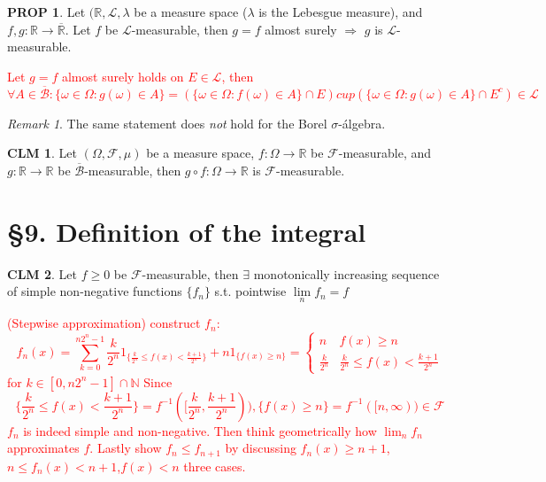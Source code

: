 \documentclass[hidelinks]{article}
\theoremstyle{definition}
\theoremstyle{dotless}
\newtheorem{proposition}{PROP}[section]
\newtheorem{claim}{CLM}[section]
\theoremstyle{remark}
\newtheorem*{remark}{Remark}
\begin{document}
\begin{proposition}
Let $(\mathbb{R},\mathscr{L},\lambda$ be a measure space ($\lambda$ is the Lebesgue measure), and $f,g:\mathbb{R}\to\overline{\mathbb{R}}$. Let $f$ be $\mathscr{L}$-measurable, then $g=f$ almost surely $\Rightarrow$ $g$ is $\mathscr{L}$-measurable.
\end{proposition}
\textcolor{red}{Let $g=f$ almost surely holds on $E\in\mathscr{L}$, then
\[\forall A\in\overline{\mathscr{B}}:\{\omega\in\Omega:g(\omega)\in A\}=(\{\omega\in\Omega:f(\omega)\in A\}\cap E)cup(\{\omega\in\Omega:g(\omega)\in A\}\cap E^c)\in\mathscr{L}\]}

\begin{remark}
The same statement does \emph{not} hold for the Borel $\sigma$-álgebra.
\end{remark}

\begin{claim}
Let $(\Omega,\mathscr{F},\mu)$ be a measure space, $f:\Omega\to\mathbb{R}$ be $\mathscr{F}$-measurable, and $g:\mathbb{R}\to\mathbb{R}$ be $\overline{\mathscr{B}}$-measurable, then $g\circ f:\Omega\to\mathbb{R}$ is $\mathscr{F}$-measurable.
\end{claim}

\bigbreak

\section*{\S9. Definition of the integral}
\setcounter{section}{9}

\begin{claim}
Let $f\geq0$ be $\mathscr{F}$-measurable, then $\exists$ monotonically increasing sequence of simple non-negative functions $\{f_n\}$ s.t. pointwise $\lim\limits_nf_n=f$
\end{claim}
\textcolor{red}{(Stepwise approximation) construct $f_n$:
\[f_n(x)=\sum_{k=0}^{n2^n-1}\frac{k}{2^n}1_{\{\frac{k}{2^n}\leq f(x)<\frac{k+1}{2^n}\}}+n1_{\{f(x)\geq n\}}=\begin{cases}
n & f(x)\geq n\\
\frac{k}{2^n} & \frac{k}{2^n}\leq f(x)<\frac{k+1}{2^n}
\end{cases}\]
for $k\in[0,n2^n-1]\cap\mathbb{N}$\newline
Since
\[\{\frac{k}{2^n}\leq f(x)<\frac{k+1}{2^n}\}=f^{-1}([\frac{k}{2^n},\frac{k+1}{2^n})),\{f(x)\geq n\}=f^{-1}([n,\infty))\in\mathscr{F}\]
$f_n$ is indeed simple and non-negative. Then think geometrically how $\lim_nf_n$ approximates $f$. Lastly show $f_n\leq f_{n+1}$ by discussing $f_n(x)\geq n+1$,$n\leq f_n(x)<n+1$,$f(x)<n$ three cases.}
\end{document}
